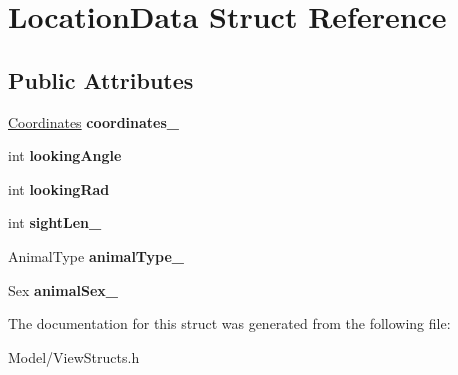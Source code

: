 \hypertarget{struct_location_data}{}\section{Location\+Data Struct Reference}
\label{struct_location_data}
\subsection*{Public Attributes}
\begin{DoxyCompactItemize}
\item 
\hypertarget{struct_location_data_a79ab6467b72c790e544128bc71d1064b}{}\hyperlink{struct_coordinates}{Coordinates} {\bfseries coordinates\+\_\+}\label{struct_location_data_a79ab6467b72c790e544128bc71d1064b}

\item 
\hypertarget{struct_location_data_a594b5614ec9a003af1ab0a8fcd2a05bf}{}int {\bfseries looking\+Angle}\label{struct_location_data_a594b5614ec9a003af1ab0a8fcd2a05bf}

\item 
\hypertarget{struct_location_data_ae20709d942ed1de4dc37aa90e788e6e4}{}int {\bfseries looking\+Rad}\label{struct_location_data_ae20709d942ed1de4dc37aa90e788e6e4}

\item 
\hypertarget{struct_location_data_a060c7a74627ae621b20e0580bd80a277}{}int {\bfseries sight\+Len\+\_\+}\label{struct_location_data_a060c7a74627ae621b20e0580bd80a277}

\item 
\hypertarget{struct_location_data_ab01bb076905deb8776c04bc6952f99b8}{}Animal\+Type {\bfseries animal\+Type\+\_\+}\label{struct_location_data_ab01bb076905deb8776c04bc6952f99b8}

\item 
\hypertarget{struct_location_data_a74571a57cc9a64d98fd14a1dc94a0bb6}{}Sex {\bfseries animal\+Sex\+\_\+}\label{struct_location_data_a74571a57cc9a64d98fd14a1dc94a0bb6}

\end{DoxyCompactItemize}


The documentation for this struct was generated from the following file\+:\begin{DoxyCompactItemize}
\item 
Model/View\+Structs.\+h\end{DoxyCompactItemize}
